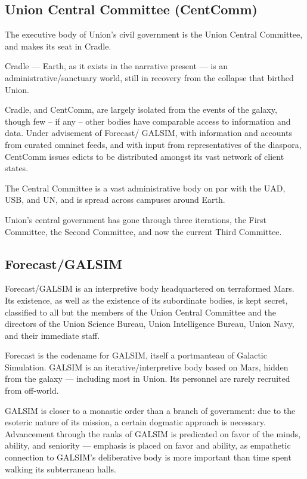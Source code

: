 \subsection{Union Central Committee (CentComm)}

The executive body of Union's civil government is the Union Central Committee, and makes its
seat in Cradle.

Cradle — Earth, as it exists in the narrative present — is an administrative/sanctuary world, still
in recovery from the collapse that birthed Union.

Cradle, and CentComm, are largely isolated from the events of the galaxy, though few -- if any --
other bodies have comparable access to information and data. Under advisement of Forecast/
GALSIM, with information and accounts from curated omninet feeds, and with input from
representatives of the diaspora, CentComm issues edicts to be distributed amongst its vast
network of client states.

The Central Committee  is a vast administrative body on par with the UAD, USB, and UN, and is
spread across campuses around Earth.

Union's central government has gone through three iterations, the First Committee, the Second
Committee, and now the current Third Committee.

\subsection{Forecast/GALSIM}

Forecast/GALSIM is an interpretive body headquartered on terraformed Mars. Its existence, as
well as the existence of its subordinate bodies, is kept secret, classified to all but the members of
the Union Central Committee and the directors of the Union Science Bureau, Union Intelligence
Bureau, Union Navy, and their immediate staff.

Forecast is the codename for GALSIM, itself a portmanteau of Galactic Simulation. GALSIM is an
iterative/interpretive body based on Mars, hidden from the galaxy — including most in Union. Its
personnel are rarely recruited from off-world.

GALSIM is closer to a monastic order than a branch of government: due to the esoteric nature of
its mission, a certain dogmatic approach is necessary. Advancement through the ranks of
GALSIM is predicated on favor of the minds, ability, and seniority — emphasis is placed on favor
and ability, as empathetic connection to GALSIM's deliberative body is more important than time
spent walking its subterranean halls.

